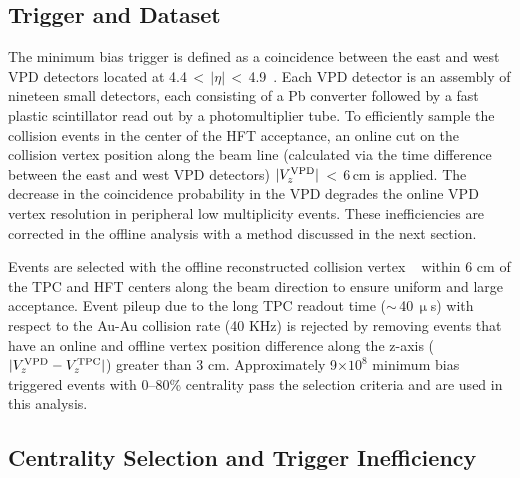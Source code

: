 \documentclass[%
 reprint,	
showpacs,
 amsmath,amssymb,
 aps,
 prc,
]{revtex4-1}
\providecommand{\DIFaddtex}[1]{{\protect\color{blue}\uwave{#1}}} %
\providecommand{\DIFdeltex}[1]{{\protect\color{red}\sout{#1}}}                      %
\providecommand{\DIFaddbegin}{} %
\providecommand{\DIFaddend}{} %
\providecommand{\DIFdelbegin}{} %
\providecommand{\DIFdelend}{} %
\providecommand{\DIFadd}[1]{\texorpdfstring{\DIFaddtex{#1}}{#1}} %
\providecommand{\DIFdel}[1]{\texorpdfstring{\DIFdeltex{#1}}{}} %
\begin{document}
\subsection{Trigger and Dataset}
\label{dataset:trigger}

The minimum bias trigger is defined as a coincidence between the east and west VPD detectors located at 4.4\,$<$\,$|\eta|$\,$<$\,4.9~\cite{VPD}. Each VPD detector is an assembly of nineteen small detectors, each consisting of a Pb converter followed by a fast plastic scintillator read out by a photomultiplier tube. To efficiently sample the collision events in the center of the HFT acceptance, an online cut on the collision vertex position along the beam line (calculated via the time difference between the east and west VPD detectors) $|V_z^{\rm VPD}|$\,$<$\,6\,cm is applied. 
The decrease in the coincidence probability in the VPD degrades the online VPD vertex resolution in peripheral low multiplicity events. These inefficiencies are corrected in the offline analysis with a method discussed in the next section. 

Events are selected with the offline reconstructed collision vertex ~\cite{Smirnov_2017} within 6 cm of the TPC and HFT centers along the beam direction to ensure uniform and large acceptance. Event pileup due to the long TPC readout time (\DIFdelbegin \DIFdel{$\sim$}\DIFdelend \DIFaddbegin \DIFadd{$\approx$}\DIFaddend \,40\,$\upmu$s) with respect to the Au-Au collision rate (40 KHz) is rejected by removing events that have an online and offline vertex position difference along the z-axis ($|V_z^{\rm VPD}-V_z^{\rm TPC}|$) greater than 3 cm. Approximately 9$\times 10^{8}$ minimum bias triggered events with 0--80\% centrality pass the selection criteria and are used in this analysis.

\subsection{Centrality Selection and Trigger Inefficiency}
\label{dataset:Centrality}
\end{document}
